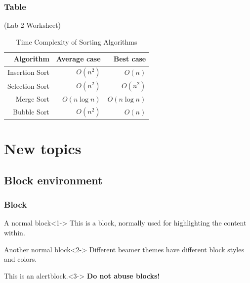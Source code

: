 \documentclass{beamer}
\begin{document}


\begin{frame}
\frametitle{Table}
(Lab 2 Worksheet)

\begin{table}
\centering
\caption{Time Complexity of Sorting Algorithms}
\begin{tabular}{|r|rr|}
\hline
Algorithm &  Average case & Best case \\
\hline
Insertion Sort & $O (n^2)$ & $O(n)$\\
Selection Sort & $O (n^2)$ & $O(n^2)$\\
Merge Sort & $O (n\log n)$ & $O(n\log n)$\\
Bubble Sort & $O (n^2)$ & $O(n)$\\
\hline
\end{tabular}
\end{table}

\end{frame}

\section{New topics}
\subsection{Block environment}
\begin{frame}
\frametitle{Block}

\begin{block}{A normal block}<1->
This is a block, normally used for highlighting the content within.
\end{block}

\begin{block}{Another normal block}<2->
Different beamer themes have different block styles and colors.
\end{block}

\vfill

\begin{alertblock}{This is an alertblock.}<3->
\textbf{Do not abuse blocks!}
\end{alertblock}


\end{frame}

\end{document}
